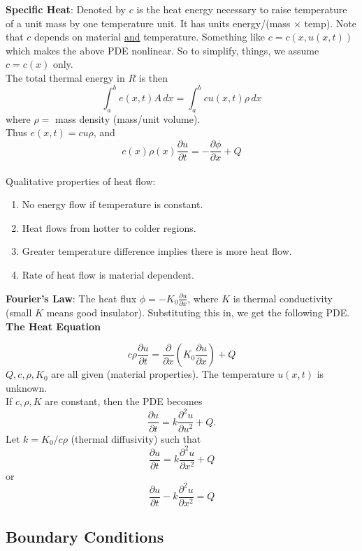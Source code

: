 \documentclass{article}
\begin{document}
	\textbf{Specific Heat}: Denoted by $ c $ is the heat energy necessary to raise temperature of a unit mass by one temperature unit. It has units energy/(mass $ \times $ temp). Note that $ c $ depends on material \underline{and} temperature. Something like $ c = c(x,u(x,t)) $ which makes the above PDE nonlinear. So to simplify, things, we assume $ c=c(x) $ only. \\
	
	The total thermal energy in $ R $ is then
	\[
		\int_a^b e(x,t)A \, dx = \int_a^b cu(x,t) \rho \, dx
	\]
	where $ \rho = $ mass density (mass/unit volume). \\
	
	Thus $ e(x,t) = cu\rho $, and
	\[
		c(x) \rho(x) \frac{\partial u}{\partial t} = -\frac{\partial \phi}{\partial x} + Q
	\]
	\\
	Qualitative properties of heat flow:
	\begin{enumerate}[label=(\arabic*)]
		\item No energy flow if temperature is constant.
		\item Heat flows from hotter to colder regions.
		\item Greater temperature difference implies there is more heat flow.
		\item Rate of heat flow is material dependent.
	\end{enumerate}

	\textbf{Fourier's Law}: The heat flux $ \phi = -K_0 \frac{\partial u}{\partial x} $, where $ K $ is thermal conductivity (small $ K $ means good insulator). Substituting this in, we get the following PDE. \\
	
	\textbf{The Heat Equation}
	
	\[
		c \rho \frac{\partial u}{\partial t} = \frac{\partial}{\partial x} \left( K_0 \frac{\partial u}{\partial x} \right) + Q
	\]
	$ Q,c,\rho,K_0 $ are all given (material properties). The temperature $ u(x,t) $ is unknown. \\
	
	If $ c,\rho, K $ are constant, then the PDE becomes
	\[
		\frac{\partial u}{\partial t} = k \frac{\partial^2 u}{\partial u^2} + Q.
	\]
	Let $ k = K_0/c\rho $ (thermal diffusivity) such that 
	\[
		\frac{\partial u}{\partial t} = k \frac{\partial^2 u}{\partial x^2} + Q
	\]
	or
	\[
		\frac{\partial u}{\partial t} - k\frac{\partial^2 u}{\partial x^2} = Q
	\]
	
	\subsection{Boundary Conditions}
	
\end{document}
